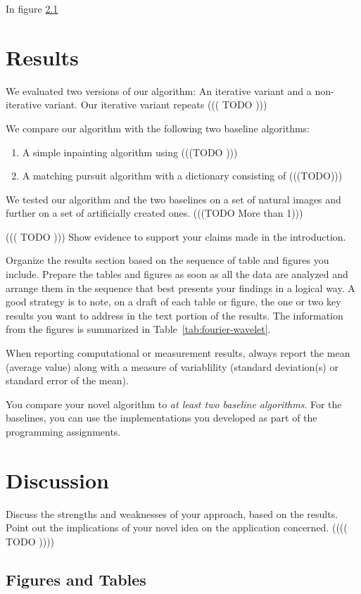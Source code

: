 \documentclass[10pt,conference,compsocconf]{IEEEtran}
\begin{document}
In figure \ref{}

\section{Results}
We evaluated two versions of our algorithm: An iterative variant and a non-iterative variant.
Our iterative variant repeats 
 ((( TODO )))
 
 We compare our algorithm with the following two baseline algorithms:
 \begin{enumerate}
 \item A simple inpainting algorithm using (((TODO )))
 \item A matching pursuit algorithm with a dictionary consisting of (((TODO)))
 \end{enumerate}
 
 We tested our algorithm and the two baselines on a set of natural images and further on a set of artificially created ones. (((TODO More than 1))) 
 
 ((( TODO )))
  Show evidence to support your claims made in the
  introduction. 
  
Organize the results section based on the sequence of table and
figures you include. Prepare the tables and figures as soon as all
the data are analyzed and arrange them in the sequence that best
presents your findings in a logical way. A good strategy is to note,
on a draft of each table or figure, the one or two key results you
want to address in the text portion of the results.
The information from the figures is
summarized in Table~\ref{tab:fourier-wavelet}.

When reporting computational or measurement results, always
report the mean (average value) along with a measure of variablility
(standard deviation(s) or standard error of the mean).

You compare your novel algorithm to \emph{at least two baseline
  algorithms}. For the baselines, you can use the implementations you
developed as part of the programming assignments.

\section{Discussion}
  Discuss the strengths and weaknesses of your
  approach, based on the results. Point out the implications of your  
  novel idea on the application concerned. (((( TODO ))))


\subsection{Figures and Tables}
\end{document}
